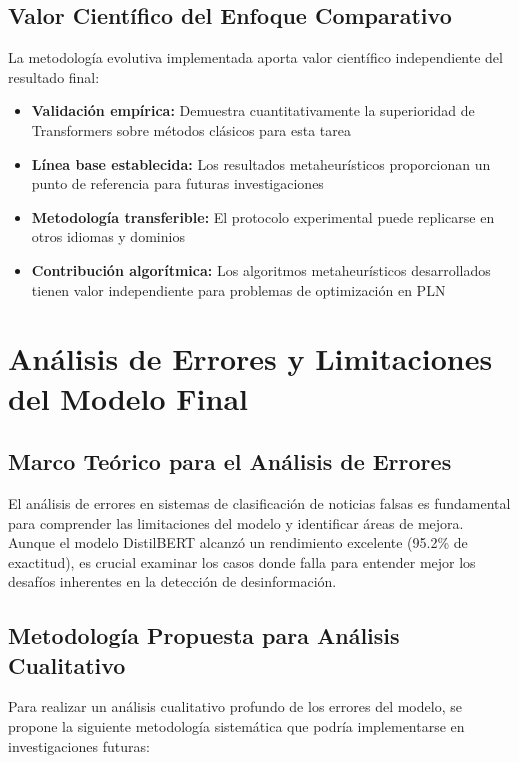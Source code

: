 \subsection{Valor Científico del Enfoque Comparativo}

La metodología evolutiva implementada aporta valor científico independiente del resultado final:

\begin{itemize}
    \item \textbf{Validación empírica:} Demuestra cuantitativamente la superioridad de Transformers sobre métodos clásicos para esta tarea
    \item \textbf{Línea base establecida:} Los resultados metaheurísticos proporcionan un punto de referencia para futuras investigaciones
    \item \textbf{Metodología transferible:} El protocolo experimental puede replicarse en otros idiomas y dominios
    \item \textbf{Contribución algorítmica:} Los algoritmos metaheurísticos desarrollados tienen valor independiente para problemas de optimización en PLN
\end{itemize}

\section{Análisis de Errores y Limitaciones del Modelo Final}
\label{sec:analisis_errores_limitaciones}

\subsection{Marco Teórico para el Análisis de Errores}

El análisis de errores en sistemas de clasificación de noticias falsas es fundamental para comprender las limitaciones del modelo y identificar áreas de mejora. Aunque el modelo DistilBERT alcanzó un rendimiento excelente (95.2\% de exactitud), es crucial examinar los casos donde falla para entender mejor los desafíos inherentes en la detección de desinformación.

\subsection{Metodología Propuesta para Análisis Cualitativo}

Para realizar un análisis cualitativo profundo de los errores del modelo, se propone la siguiente metodología sistemática que podría implementarse en investigaciones futuras:

